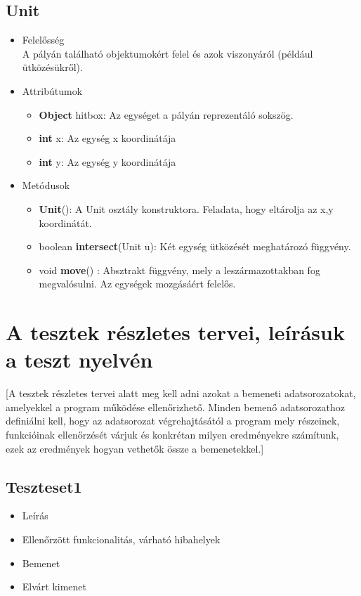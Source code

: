 \begin{itemize}
\begin{itemize}
	\end{itemize}
\end{itemize}

\subsection{Unit}
\begin{itemize}
\item Felelősség\\
A pályán található objektumokért felel és azok viszonyáról (például ütközésükről).
\item Attribútumok
	\begin{itemize}
		\item \textbf{Object} hitbox: Az egységet a pályán reprezentáló sokszög.
		\item \textbf{int} x: Az egység x koordinátája
		\item \textbf{int} y: Az egység y koordinátája
	\end{itemize}
\item Metódusok
	\begin{itemize}
	    \item \textbf{Unit}(): A Unit osztály konstruktora. Feladata, hogy eltárolja az x,y koordinátát.
		\item boolean \textbf{intersect}(Unit u): Két egység ütközését meghatározó függvény.
		\item void \textbf{move}() : Absztrakt függvény, mely a leszármazottakban fog megvalósulni. Az egységek mozgásáért felelős.
	\end{itemize}
\end{itemize}

\section{A tesztek részletes tervei, leírásuk a teszt nyelvén}
[A tesztek részletes tervei alatt meg kell adni azokat a bemeneti adatsorozatokat, amelyekkel a program működése ellenőrizhető. Minden bemenő adatsorozathoz definiálni kell, hogy az adatsorozat végrehajtásától a program mely részeinek, funkcióinak ellenőrzését várjuk és konkrétan milyen eredményekre számítunk, ezek az eredmények hogyan vethetők össze a bemenetekkel.]

\subsection{Teszteset1}
\begin{itemize}
\item Leírás\newline
{}
\item Ellenőrzött funkcionalitás, várható hibahelyek
\item Bemenet\newline
{}
\item Elvárt kimenet\newline
{}
\end{itemize}

